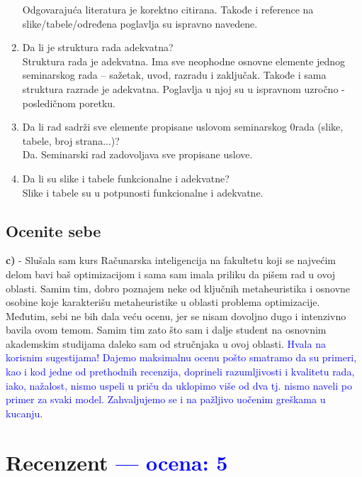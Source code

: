 \documentclass[a4paper]{report}
\newcommand{\odgovor}[1]{\textcolor{blue}{#1}}
\begin{document}
\begin{enumerate}
  Odgovarajuća literatura je korektno citirana. Takođe i reference na slike/tabele/određena poglavlja su ispravno navedene.
\item Da li je struktura rada adekvatna?\\
  Struktura rada je adekvatna. Ima sve neophodne osnovne elemente jednog seminarskog rada -- sažetak, uvod, razradu i zaključak. Takođe i sama struktura razrade je adekvatna. Poglavlja u njoj su u ispravnom uzročno - posledičnom poretku.
\item Da li rad sadrži sve elemente propisane uslovom seminarskog 0rada (slike, tabele, broj strana...)?\\ Da. Seminarski rad zadovoljava sve propisane uslove.
\item Da li su slike i tabele funkcionalne i adekvatne? \\ Slike i tabele su u potpunosti funkcionalne i adekvatne.
\end{enumerate}

\section{Ocenite sebe}

\textbf{c)} - Slušala sam kurs Računarska inteligencija na fakultetu koji se najvećim delom bavi baš optimizacijom i sama sam imala priliku da pišem rad u ovoj oblasti. Samim tim, dobro poznajem neke od ključnih metaheuristika i osnovne osobine koje karakterišu metaheuristike u oblasti problema optimizacije. Međutim, sebi ne bih dala veću ocenu, jer se nisam dovoljno dugo i intenzivno bavila ovom temom. Samim tim zato što sam i dalje student na osnovnim akademskim studijama daleko sam od stručnjaka u ovoj oblasti. \odgovor{Hvala na korisnim sugestijama! Dajemo maksimalnu ocenu pošto smatramo da su primeri, kao i kod jedne od prethodnih recenzija, doprineli razumljivosti i kvalitetu rada, iako, nažalost, nismo uspeli u priču da uklopimo više od dva tj. nismo naveli po primer za svaki model. Zahvaljujemo se i na pažljivo uočenim greškama u kucanju.}

\chapter{Recenzent \odgovor{--- ocena: 5} }
\end{document}
